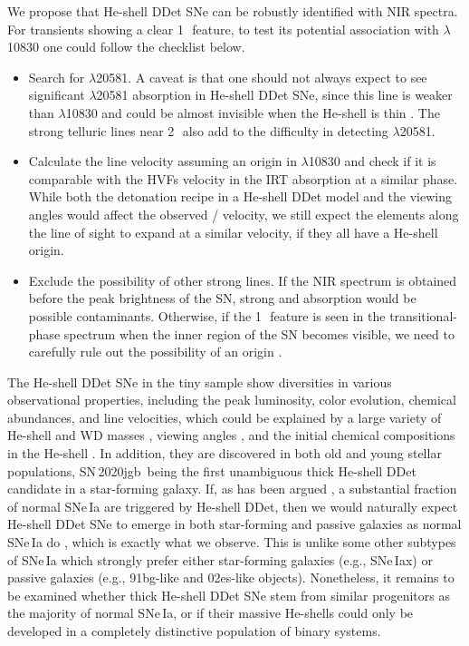 \documentclass[twocolumn]{aastex631}
\newcommand{\sn}{SN\,2020jgb}
\newcommand{\chang}[1]{\textcolor{blue}{[Chang: #1]}}
\begin{document}
We propose that He-shell DDet SNe can be robustly identified with NIR spectra. For transients showing a clear 1\,\micron\ feature, to test its potential association with  $\lambda$10830 one could follow the checklist below.
\begin{itemize}
    \item Search for  $\lambda$20581. A caveat is that one should not always expect to see significant  $\lambda$20581 absorption in He-shell DDet SNe, since this line is weaker than  $\lambda$10830 and could be almost invisible when the He-shell is thin \citep{Boyle2017_Helium}. The strong telluric lines near 2\,\micron\ also add to the difficulty in detecting  $\lambda$20581.
    \item Calculate the line velocity assuming an origin in  $\lambda$10830 and check if it is comparable with the HVFs velocity in the  IRT absorption at a similar phase. While both the detonation recipe in a He-shell DDet model and the viewing angles would affect the observed / velocity, we still expect the elements along the line of sight to expand at a similar velocity, if they all have a He-shell origin.
    \item Exclude the possibility of other strong lines. If the NIR spectrum is obtained before the peak brightness of the SN, strong  and  absorption \citep{Hsiao_CSP_2019} would be possible contaminants. Otherwise, if the 1\,\micron\ feature is seen in the transitional-phase spectrum when the inner region of the SN becomes visible, we need to carefully rule out the possibility of an  origin \citep{Marion2009_NIR}.
\end{itemize}

The He-shell DDet SNe in the tiny sample show diversities in various observational properties, including the peak luminosity, color evolution, chemical abundances, and line velocities, which could be explained by a large variety of He-shell and WD masses \citep{polin_observational_2019,Shen_2D_2021}, viewing angles \citep{Shen_2D_2021}, and the initial chemical compositions in the He-shell \citep{Kromer_DD_2010}. In addition, they are discovered in both old and young stellar populations, \sn\ being the first unambiguous thick He-shell DDet candidate in a star-forming galaxy. If, as has been argued \citep[e.g.,][]{Sanders_2021, Eitner_2022}, a substantial fraction of normal SNe\,Ia are triggered by He-shell DDet, then we would naturally expect He-shell DDet SNe to emerge in both star-forming and passive galaxies as normal SNe\,Ia do \citep[e.g.,][]{Sullivan_2006,Smith_2012}, which is exactly what we observe. This is unlike some other subtypes of SNe\,Ia \citep{Jha_2019} which strongly prefer either star-forming galaxies (e.g., SNe\,Iax) or passive galaxies (e.g., 91bg-like and 02es-like objects). Nonetheless, it remains to be examined whether thick He-shell DDet SNe stem from similar progenitors as the majority of normal SNe\,Ia, or if their massive He-shells could only be developed in a completely distinctive population of binary systems.
\end{document}
